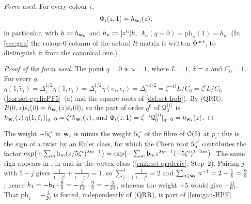 \emph{Form used.} For every colour $i$,
\begin{equation}
\label{eq:set-qrr}
\Phi_i(z,1)=h_{\mathbf{w}_i}(z);
\end{equation}
in particular, with $h\coloneqq h_{\mathbf{w}_0}$ and $h_n\coloneqq[z^n]h$, $A_n(q=0)=\mathrm{ph}_n(1)=h_n$. (In \cref{sec:gau} the colour-$0$ column of the actual $R$-matrix is written $\Phi^{\mathrm{act}}$, to distinguish it from the canonical one.)

\begin{proof}[Proof of the form used]
The point $q=0$ is $u=1$, where $L=1$, $\hat{z}=z$ and $C_0=1$. For every $q$, $\eta(1,\tilde e_i)=\Delta_i^{1/2}\eta(1,e_i)=\Delta_i^{1/2}\eta(e_i,e_i)=\Delta_i^{-1/2}=\zeta^{-4i}L/C_0=\zeta^iL/C_0$ (\cref{cor:set-cyclicPF5}~(a) and the square roots of \cref{def:set-frob}). By (QRR), $R(0,z)\tilde e_i(0)=h_{\mathbf{w}_i}(z)\tilde e_i(0)$, so the part of order $q^0$ of $\mathcal{Q}^{(i)}_0$ is $h_{\mathbf{w}_i}(z)\,\eta(1,\tilde e_i)|_{q=0}=\zeta^ih_{\mathbf{w}_i}(z)$, and $\Phi_i(z,1)=\zeta^{-i}\mathcal{Q}^{(i)}_0|_{q=0}=h_{\mathbf{w}_i}(z)$.
\end{proof}

\begin{rmk}
\label{rmk:set-qrrsign}
The weight $-5\zeta^i$ in $\mathbf{w}_i$ is minus the weight $5\zeta^i$ of the fibre of $\mathcal{O}(5)$ at $p_i$: this is the sign of a twist by an Euler class, for which the Chern root $5\zeta^i$ contributes the factor $\exp\bigl(+\sum_m\mathsf{b}_m(z/5\zeta^i)^{2m-1}\bigr)=\exp\bigl(-\sum_m\mathsf{b}_mz^{2m-1}(-5\zeta^i)^{1-2m}\bigr)$. The same sign appears in \cite[(17)]{GJR18}, in \cite[Corollary~1]{MR2276766} and in the vertex class \cite[(26)]{LP20} (\cref{rmk:set-qrrderiv}, Step~2). Pairing $j$ with $5-j$ gives $\frac1{1-\zeta^j}+\frac1{1-\zeta^{-j}}=1$, so $\sum_{j=1}^4\frac1{1-\zeta^j}=2$ and $\sum_{a\in\mathbf{w}_0}a^{-1}=2-\frac15=\frac95$; hence $h_1=-\mathsf{b}_1\cdot\frac95=-\frac1{12}\cdot\frac95=-\frac3{20}$, whereas the weight $+5$ would give $-\frac{11}{60}$. That $\mathrm{ph}_1=-\frac3{20}$ is forced, independently of (QRR), is part of \cref{lem:gau-HPF}.
\end{rmk}

